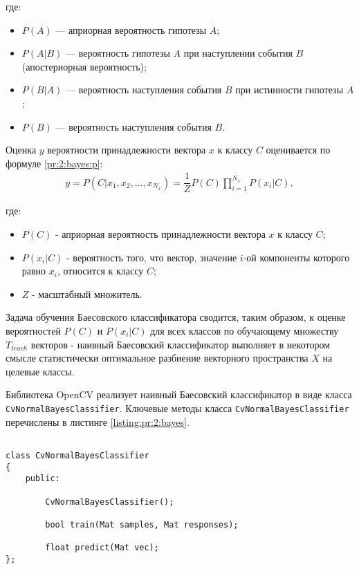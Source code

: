 где:

\begin{itemize}

	\item $P(A)$ — априорная вероятность гипотезы $A$;
	\item $P(A | B)$ — вероятность гипотезы $A$ при наступлении события $B$ (апостериорная вероятность);
	\item $P(B | A)$ — вероятность наступления события $B$ при истинности гипотезы $A$;
	\item $P(B)$ — вероятность наступления события $B$.

\end{itemize}

Оценка $y$ вероятности принадлежности вектора $x$ к классу $C$ оценивается по формуле \eqref{pr:2:bayes:p}:
\begin{gather}
	\label{pr:2:bayes:p}
	y = P(C | x_1, x_2, ..., x_{N_x}) = \dfrac{1}{Z} P(C) \prod_{i = 1}^{N_x} P(x_i | C),
\end{gather}

где:

\begin{itemize}

	\item $P(C)$ - априорная вероятность принадлежности вектора $x$ к классу $C$;
	\item $P(x_i | C)$ - вероятность того, что вектор, значение $i$-ой компоненты которого равно $x_i$, относится к классу $C$;
	\item $Z$ - масштабный множитель.

\end{itemize}

Задача обучения Баесовского классификатора сводится, таким образом, к оценке вероятностей $P(C)$ и $P(x_i | C)$ для всех классов по обучающему множеству $T_{teach}$ векторов - наивный Баесовский классификатор выполняет в некотором смысле статистически оптимальное разбиение векторного пространства $X$ на целевые классы.

Библиотека OpenCV реализует наивный Баесовский классификатор в виде класса \linebreak \verb|CvNormalBayesClassifier|. Ключевые методы класса \verb|CvNormalBayesClassifier| перечислены в листинге \ref{listing:pr:2:bayes}.

\begin{lstlisting}

class CvNormalBayesClassifier
{
	public:

		CvNormalBayesClassifier();

		bool train(Mat samples, Mat responses);

		float predict(Mat vec);
};

\end{lstlisting}
\mylistingend

